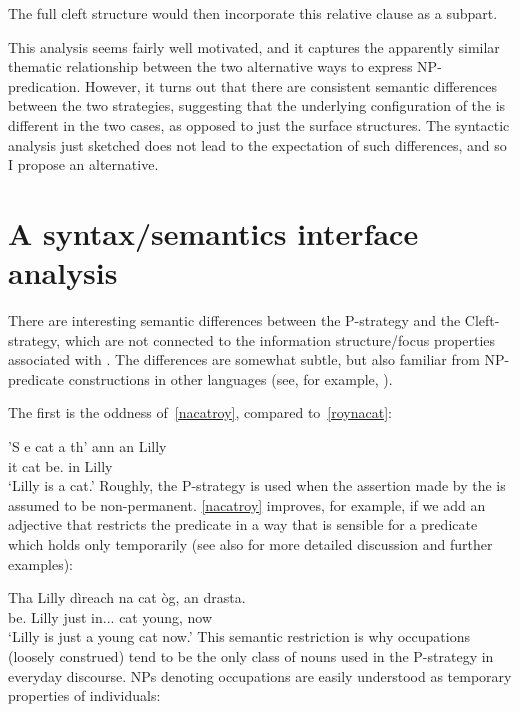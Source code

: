 \documentclass[output=paper]{langsci/langscibook}
\begin{document}
The full cleft structure would then incorporate this relative clause as a subpart.

This analysis seems fairly well motivated, and it captures the apparently
similar thematic relationship between the two alternative ways to express
NP-pred\-i\-ca\-tion.  However,  it turns out that there are consistent
semantic differences between the two strategies, suggesting that the underlying
configuration of the  is different in the two cases, as opposed to
just the surface structures. The syntactic analysis just sketched does not lead
to the expectation of such differences, and so I propose an alternative.

\section{A syntax/semantics interface analysis}

There are interesting semantic differences between the P-strategy and the
Cleft-strategy, which are not connected to the information structure/focus
properties associated with . The differences are somewhat subtle, but
also familiar from NP-predicate constructions in other languages (see, for
example, \citealt{roy:06}).

The first is the oddness of~\eqref{nacatroy}, compared to~\eqref{roynacat}:

\ea {}
    \label{nacatroy}
\z

\ea {} \label{roynacat}
\sn \gll 'S e cat a th' {ann an} Lilly\\
\Cop{} it cat \Rel{} be.\Prs{} in Lilly\\
\glt \enquote*{Lilly is a cat.}
\z
Roughly, the P-strategy is used when the assertion made by the  is
assumed to be non-permanent. \eqref{nacatroy} improves, for example, if we add an
adjective that restricts the predicate in a way that is sensible for a predicate
which holds only temporarily (see also \citealt{schreiner:15} for more detailed
discussion and further examples):

\ea {}
\sn \gll Tha Lilly d\`ireach na cat \`og, an drasta.\\
be.\Prs{} Lilly just in.\Poss.\Tsg.\glossF{} cat young, now\\
\glt \enquote*{Lilly is just a young cat now.}
\z
This semantic restriction is why occupations (loosely construed) tend to be the
only class of nouns used in the P-strategy in everyday discourse. NPs denoting
occupations are easily understood as temporary properties of
individuals:
\end{document}
